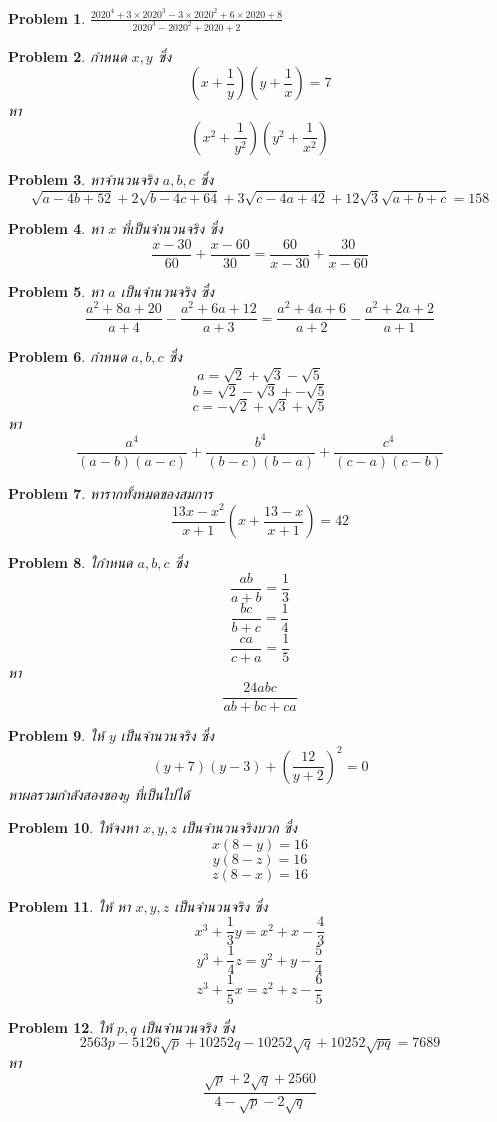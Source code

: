 \documentclass[a4paper,12pt]{article}
\newtheorem{problem}{Problem}
\begin{document}
	\begin{problem}
		$\frac{2020^4+3\times2020^3-3\times2020^2+6\times2020+8}{2020^3-2020^2+2020+2}$
	\end{problem}
	\begin{problem}
		กำหนด $x,y$ ซึ่ง
		$$(x+\frac{1}{y})(y+\frac{1}{x})=7$$
		หา 
		$$(x^2+\frac{1}{y^2})(y^2+\frac{1}{x^2})$$
	\end{problem}
	\begin{problem}
		หาจำนวนจริง $a,b,c$ ซึ่ง 
		$$\sqrt{a-4b+52}+2\sqrt{b-4c+64}+3\sqrt{c-4a+42}+12\sqrt{3}\sqrt{a+b+c}=158$$
	\end{problem}
	\begin{problem}
		หา $x$ ที่เป็นจำนวนจริง ซึ่ง
		$$\frac{x-30}{60}+\frac{x-60}{30}= \frac{60}{x-30}+\frac{30}{x-60}$$
	\end{problem}
	\begin{problem}
		หา $a$ เป็นจำนวนจริง ซึ่ง 
		$$\frac{a^2+8a+20}{a+4}-\frac{a^2+6a+12}{a+3}=\frac{a^2+4a+6}{a+2}-\frac{a^2+2a+2}{a+1}$$
	\end{problem}
	\begin{problem}
		กำหนด $a,b,c$ ซึ่ง 
		$$a=\sqrt{2}+\sqrt{3}-\sqrt{5}$$
		$$b=\sqrt{2}-\sqrt{3}+-\sqrt{5}$$
		$$c=-\sqrt{2}+\sqrt{3}+\sqrt{5}$$
		หา
		$$\frac{a^4}{(a-b)(a-c)}+\frac{b^4}{(b-c)(b-a)}+\frac{c^4}{(c-a)(c-b)}$$
	\end{problem}
	\begin{problem}
		หารากทั้งหมดของสมการ 
		$$\frac{13x-x^2}{x+1}(x+\frac{13-x}{x+1})=42$$
	\end{problem}
	\begin{problem}
		ใกำหนด $a,b,c$ ซึ่ง
		$$\frac{ab}{a+b}=\frac{1}{3}$$
		$$\frac{bc}{b+c}=\frac{1}{4}$$
		$$\frac{ca}{c+a}=\frac{1}{5}$$
		หา
		$$\frac{24abc}{ab+bc+ca}$$
	\end{problem}
	\begin{problem}
		ให้ $y$ เป็นจำนวนจริง ซึ่ง
		$$(y+7)(y-3)+(\frac{12}{y+2})^2=0$$
		หาผลรวมกำลังสองของ$y $ ที่เป็นไปได้
	\end{problem}
	\begin{problem}
		ให้จงหา $x,y,z$ เป็นจำนวนจริงบวก ซึ่ง
		$$x(8-y)=16$$
		$$y(8-z)=16$$
		$$z(8-x)=16$$
	\end{problem}

\begin{problem}
		ให้ หา $x,y,z$ เป็นจำนวนจริง ซึ่ง
	$$ x^3+\frac{1}{3}y = x^2+x-\frac{4}{3}$$
	$$y^3+\frac{1}{4}z=y^2+y-\frac{5}{4}$$
	$$z^3+\frac{1}{5}x=z^2+z-\frac{6}{5}$$
\end{problem}

\begin{problem}
	ให้ $p,q$ เป็นจำนวนจริง ซึ่ง
	$$2563p-5126\sqrt{p}+10252q-10252\sqrt{q}+10252\sqrt{pq}=7689$$
	หา $$\frac{\sqrt{p}+2\sqrt{q}+2560}{4-\sqrt{p}-2\sqrt{q}}$$
\end{problem}
\end{document}
